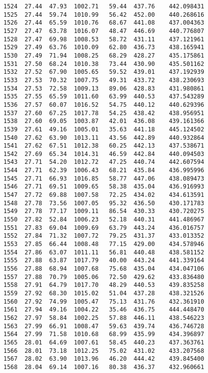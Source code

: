 \documentclass[11pt]{article}
\begin{document}
\begin{tcolorbox}[breakable, size=fbox, boxrule=.5pt, pad at break*=1mm, opacityfill=0]
\begin{Verbatim}[commandchars=\\\{\}]
1524  27.44  47.93  1002.71   59.44  437.76    442.098431
1525  27.44  59.74  1010.99   56.42  452.00    440.268616
1526  27.44  65.59  1010.76   68.67  441.08    437.004363
1527  27.47  63.78  1016.07   48.47  446.69    440.776807
1528  27.47  69.98  1008.53   58.72  431.11    437.121961
1529  27.49  63.76  1010.09   62.80  436.73    438.165941
1530  27.49  71.94  1008.25   68.29  428.27    435.175861
1531  27.50  68.24  1010.38   73.44  430.90    435.501162
1532  27.52  67.90  1005.65   59.52  439.01    437.192939
1533  27.53  70.32  1007.75   49.31  433.72    438.230693
1534  27.53  72.58  1009.13   89.06  428.83    431.980861
1535  27.55  65.59  1011.60   63.99  440.53    437.543289
1536  27.57  60.07  1016.52   54.75  440.12    440.629396
1537  27.60  67.25  1017.78   54.25  438.42    438.956951
1538  27.60  69.05  1003.87   42.01  436.08    439.161366
1539  27.61  49.16  1005.01   35.63  441.18    445.124502
1540  27.62  63.90  1013.11   43.56  442.89    440.932864
1541  27.62  67.51  1012.38   60.25  442.13    437.538671
1542  27.69  65.34  1014.31   46.59  442.84    440.094503
1543  27.71  54.20  1012.72   47.25  440.74    442.607594
1544  27.71  62.39  1006.43   68.21  435.84    436.995996
1545  27.71  66.93  1016.85   58.77  447.06    438.089473
1546  27.71  69.51  1009.65   58.38  435.04    436.916993
1547  27.72  69.88  1007.58   72.25  434.02    434.613591
1548  27.78  73.56  1007.05   95.32  436.50    430.171783
1549  27.78  77.17  1009.11   86.54  430.33    430.720275
1550  27.82  52.84  1006.23   52.18  440.31    441.486967
1551  27.83  69.04  1009.69   63.79  443.24    436.016757
1552  27.84  71.32  1007.72   79.25  431.37    433.013352
1553  27.85  66.44  1008.48   77.15  429.00    434.578946
1554  27.86  63.07  1011.11   56.81  440.48    438.581152
1555  27.88  63.87  1017.79   40.00  443.24    441.339164
1556  27.88  68.94  1007.68   75.68  435.04    434.047106
1557  27.88  70.79  1005.06   72.50  429.62    433.836480
1558  27.91  64.79  1017.70   48.29  440.53    439.835258
1559  27.92  68.30  1015.02   51.04  437.28    438.321526
1560  27.92  74.99  1005.47   75.13  431.76    432.361910
1561  27.94  49.16  1004.22   35.46  436.75    444.448470
1562  27.97  58.84  1002.25   57.88  446.11    438.546223
1563  27.99  66.91  1008.47   59.63  439.74    436.746728
1564  27.99  71.58  1010.68   68.99  435.99    434.396897
1565  28.01  64.69  1007.61   58.45  440.23    437.363761
1566  28.01  73.18  1012.25   75.02  431.02    433.207568
1567  28.02  63.90  1013.96   46.20  444.42    439.845400
1568  28.04  69.14  1007.16   80.38  436.37    432.960661

\end{Verbatim}
\end{tcolorbox}
\end{document}
